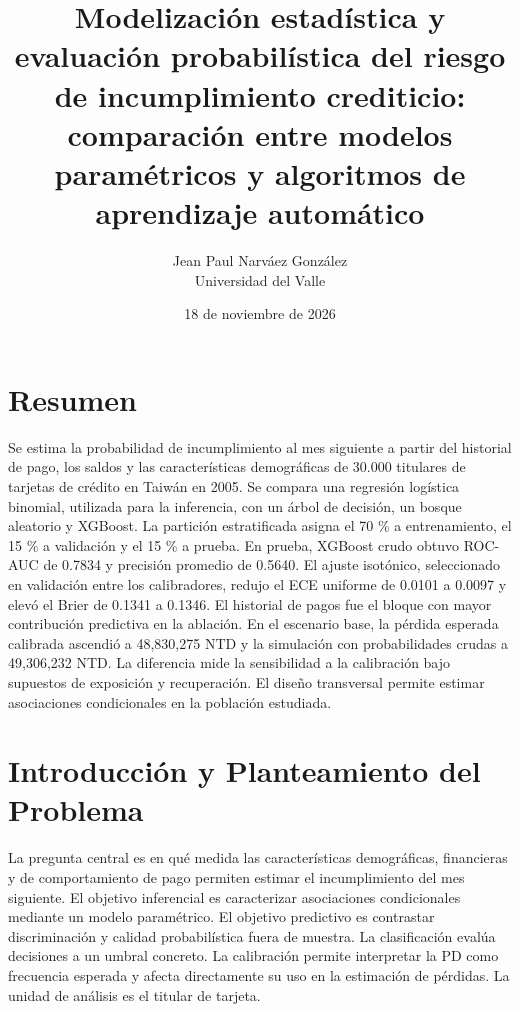 \documentclass[11pt, a4paper]{article}
\title{Modelización estadística y evaluación probabilística del riesgo de incumplimiento crediticio: comparación entre modelos paramétricos y algoritmos de aprendizaje automático}
\author{Jean Paul Narváez González\\Universidad del Valle}
\date{18 de noviembre de 2026}
\begin{document}
\decimalpoint
\maketitle
\section*{Resumen}
Se estima la probabilidad de incumplimiento al mes siguiente a partir del historial de pago, los saldos y las características demográficas de 30.000 titulares de tarjetas de crédito en Taiwán en 2005. Se compara una regresión logística binomial, utilizada para la inferencia, con un árbol de decisión, un bosque aleatorio y XGBoost. La partición estratificada asigna el 70 \% a entrenamiento, el 15 \% a validación y el 15 \% a prueba. En prueba, XGBoost crudo obtuvo ROC-AUC de 0.7834 y precisión promedio de 0.5640. El ajuste isotónico, seleccionado en validación entre los calibradores, redujo el ECE uniforme de 0.0101 a 0.0097 y elevó el Brier de 0.1341 a 0.1346. El historial de pagos fue el bloque con mayor contribución predictiva en la ablación. En el escenario base, la pérdida esperada calibrada ascendió a 48,830,275 NTD y la simulación con probabilidades crudas a 49,306,232 NTD. La diferencia mide la sensibilidad a la calibración bajo supuestos de exposición y recuperación. El diseño transversal permite estimar asociaciones condicionales en la población estudiada.
\section{Introducción y Planteamiento del Problema}
La pregunta central es en qué medida las características demográficas, financieras y de comportamiento de pago permiten estimar el incumplimiento del mes siguiente. El objetivo inferencial es caracterizar asociaciones condicionales mediante un modelo paramétrico. El objetivo predictivo es contrastar discriminación y calidad probabilística fuera de muestra. La clasificación evalúa decisiones a un umbral concreto. La calibración permite interpretar la PD como frecuencia esperada y afecta directamente su uso en la estimación de pérdidas. La unidad de análisis es el titular de tarjeta.
\end{document}
